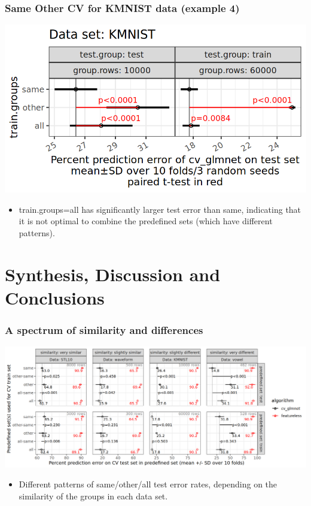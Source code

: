 \documentclass{beamer}
\begin{document}
\begin{frame}
  \frametitle{Same Other CV for KMNIST data (example 4)}
  \includegraphics[width=\textwidth]{KMNIST_error_glmnet_sizes_mean_SD_pvalue.png}
  \begin{itemize}
  \item train.groups=all has significantly larger test error than
    same, indicating that it is not optimal to combine the
    predefined sets (which have different patterns). 
  \end{itemize}
\end{frame}

\section{Synthesis, Discussion and Conclusions}

\begin{frame}
  \frametitle{A spectrum of similarity and differences}
  \includegraphics[width=\textwidth]{data_Classif_batchmark_registry_glmnet_featureless_mean_sd}
  \begin{itemize}
  \item Different patterns of same/other/all
    test error rates, depending on the similarity of the
    groups in each data set.
  \end{itemize}
\end{frame}
 
\end{document}
